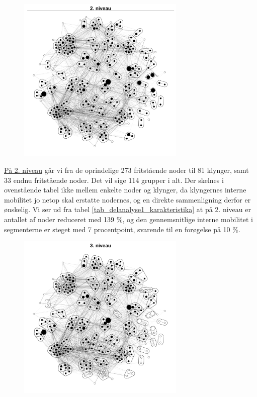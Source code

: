 \begin{figure}
  \vspace{-20pt}
  \begin{center}
   \caption{}
   \label{fig_delanalyse1_kort_seg_proces2}
    \includegraphics[width=8cm]{fig/netvaerkskort/kort_seg_proces2.pdf}
  \end{center}
  \vspace{-20pt}
\end{figure}
%

\underline{På 2. niveau} går vi fra de oprindelige 273 fritstående noder til 81 klynger, samt 33 endnu fritstående noder. Det vil sige 114 grupper i alt. Der skelnes i ovenstående tabel ikke mellem enkelte noder og klynger, da klyngernes interne mobilitet jo netop skal erstatte nodernes, og en direkte sammenligning derfor er ønskelig.
Vi ser ud fra tabel \ref{tab_delanalyse1_karakteristika} at på 2. niveau er antallet af noder reduceret med 139 \%, og den gennemsnitlige interne mobilitet i segmenterne er steget med 7 procentpoint, svarende til en forøgelse på 10 \%. 

\begin{figure}
  \vspace{-20pt}
  \begin{center}
   \caption{}
   \label{fig_delanalyse1_kort_seg_proces3}
    \includegraphics[width=8cm]{fig/netvaerkskort/kort_seg_proces3.pdf}
  \end{center}
  \vspace{-20pt}
\end{figure}

